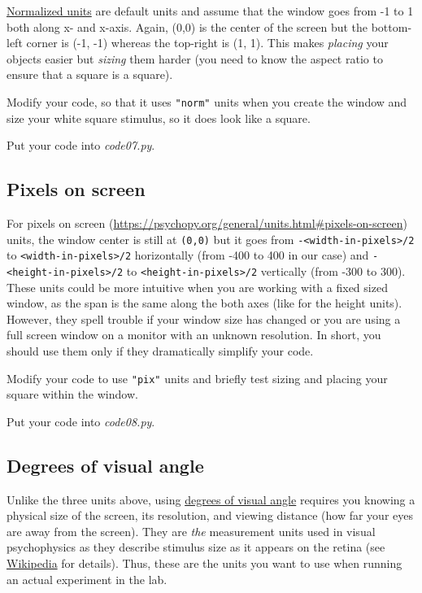 \documentclass[
]{book}
\begin{document}
\href{https://psychopy.org/general/units.html\#normalised-units}{Normalized units} are default units and assume that the window goes from -1 to 1 both along x- and x-axis. Again, (0,0) is the center of the screen but the bottom-left corner is (-1, -1) whereas the top-right is (1, 1). This makes \emph{placing} your objects easier but \emph{sizing} them harder (you need to know the aspect ratio to ensure that a square is a square).

Modify your code, so that it uses \texttt{"norm"} units when you create the window and size your white square stimulus, so it does look like a square.

Put your code into \emph{code07.py}.

\hypertarget{pixels-on-screen}{%
\subsection{Pixels on screen}\label{pixels-on-screen}}

For pixels on screen (\url{https://psychopy.org/general/units.html\#pixels-on-screen}) units, the window center is still at \texttt{(0,0)} but it goes from \texttt{-\textless{}width-in-pixels\textgreater{}/2} to \texttt{\textless{}width-in-pixels\textgreater{}/2} horizontally (from -400 to 400 in our case) and \texttt{-\textless{}height-in-pixels\textgreater{}/2} to \texttt{\textless{}height-in-pixels\textgreater{}/2} vertically (from -300 to 300). These units could be more intuitive when you are working with a fixed sized window, as the span is the same along the both axes (like for the height units). However, they spell trouble if your window size has changed or you are using a full screen window on a monitor with an unknown resolution. In short, you should use them only if they dramatically simplify your code.

Modify your code to use \texttt{"pix"} units and briefly test sizing and placing your square within the window.

Put your code into \emph{code08.py}.

\hypertarget{degrees-of-visual-angle}{%
\subsection{Degrees of visual angle}\label{degrees-of-visual-angle}}

Unlike the three units above, using \href{https://psychopy.org/general/units.html\#degrees-of-visual-angle}{degrees of visual angle} requires you knowing a physical size of the screen, its resolution, and viewing distance (how far your eyes are away from the screen). They are \emph{the} measurement units used in visual psychophysics as they describe stimulus size as it appears on the retina (see \href{https://en.wikipedia.org/wiki/Visual_angle}{Wikipedia} for details). Thus, these are the units you want to use when running an actual experiment in the lab.
\end{document}
